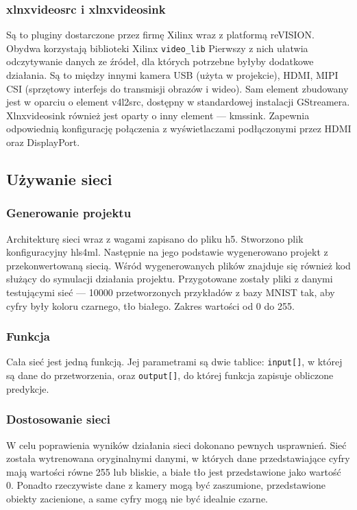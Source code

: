 \documentclass[12pt, oneside]{article}
\begin{document}
\subsubsection{xlnxvideosrc i xlnxvideosink}
Są to pluginy dostarczone przez firmę Xilinx wraz z platformą reVISION.
Obydwa korzystają biblioteki Xilinx \lstinline{video_lib}
Pierwszy z nich ułatwia odczytywanie danych ze źródeł, dla których potrzebne
byłyby dodatkowe działania. Są to między innymi kamera USB (użyta w projekcie),
HDMI, MIPI CSI (sprzętowy interfejs do transmisji obrazów i wideo).
Sam element zbudowany jest w oparciu o element v4l2src, dostępny
w standardowej instalacji GStreamera.
Xlnxvideosink również jest oparty o inny element --- kmssink.
Zapewnia odpowiednią konfigurację połączenia z wyświetlaczami
podłączonymi przez HDMI oraz DisplayPort.


\subsection{Używanie sieci}
\subsubsection{Generowanie projektu}
Architekturę sieci wraz z wagami zapisano do pliku h5. Stworzono
plik konfiguracyjny hls4ml. Następnie na jego podstawie wygenerowano projekt
z przekonwertowaną siecią. Wśród wygenerowanych plików znajduje się
również kod służący do symulacji działania projektu. Przygotowane zostały
pliki z danymi testującymi sieć --- 10000 przetworzonych przykładów z bazy
MNIST tak, aby cyfry były koloru czarnego, tło białego. Zakres wartości
od 0 do 255.

\subsubsection{Funkcja}
Cała sieć jest jedną funkcją. Jej parametrami są dwie tablice:
\lstinline[style=hls]{input[]}, w której są dane do przetworzenia,
oraz \lstinline[style=hls]{output[]}, do której funkcja zapisuje
obliczone predykcje.

\begin{minipage}{\linewidth}

\end{minipage}

\subsubsection{Dostosowanie sieci}
W celu poprawienia wyników działania sieci dokonano pewnych usprawnień.
Sieć została wytrenowana oryginalnymi danymi, w których dane przedstawiające
cyfry mają wartości równe 255 lub bliskie, a białe tło jest przedstawione
jako wartość 0.
Ponadto rzeczywiste dane z kamery mogą być zaszumione,
przedstawione obiekty zacienione, a same cyfry mogą nie być idealnie czarne.
\end{document}
